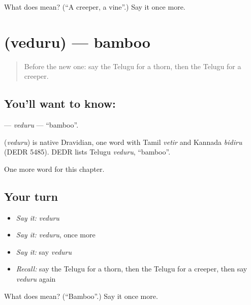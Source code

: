 \begin{tcolorbox}[breakable,colback=teal!4,colframe=teal!35!black,title={Before you move on}]
What does  mean? (\textquotedblleft{}A creeper, a vine\textquotedblright{}.) Say it once more.
\end{tcolorbox}
\section[\texorpdfstring{\te{వెదురు} (veduru)}{వెదురు (veduru)}]{ (veduru) — bamboo}

\label{lesson:TE-C303-veduru}



\begin{quote}
Before the new one: say the Telugu for a thorn, then the Telugu for a creeper.
\end{quote}

\subsection*{You'll want to know: }
\textbf{} — \emph{veduru} — \textquotedblleft{}bamboo\textquotedblright{}.

\begin{cousinweb}
\textbf{} (\emph{veduru}) is native Dravidian, one word with Tamil \emph{vetir} and Kannada \emph{bidiru} (DEDR 5485). DEDR lists Telugu \emph{veduru}, \textquotedblleft{}bamboo\textquotedblright{}.
\end{cousinweb}

\begin{grammarlens}[title={What you've built}]
One more word for this chapter.
\end{grammarlens}

\subsection*{Your turn}
\begin{itemize}
\raggedright
  \item \emph{Say it:} \emph{veduru}
  \item \emph{Say it:} \emph{veduru}, once more
  \item \emph{Say it:} say \emph{veduru}
  \item \emph{Recall:} say the Telugu for a thorn, then the Telugu for a creeper, then say \emph{veduru} again
\end{itemize}

\begin{tcolorbox}[breakable,colback=teal!4,colframe=teal!35!black,title={Before you move on}]
What does  mean? (\textquotedblleft{}Bamboo\textquotedblright{}.) Say it once more.
\end{tcolorbox}

